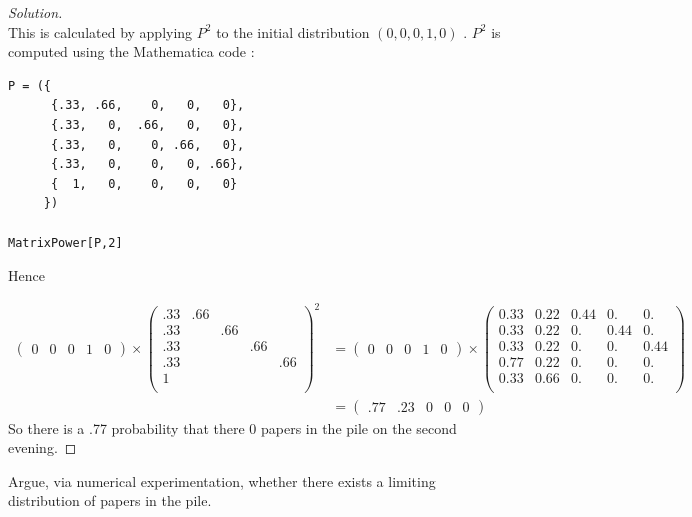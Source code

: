 \documentclass[12pt]{article}
\newenvironment{problem}[2][Problem]{\begin{trivlist}
\item[\hskip \labelsep {\bfseries #1}\hskip \labelsep {\bfseries #2.}]}{\end{trivlist}}
\newenvironment{solution}
  {\begin{proof}[Solution]\renewcommand{\qedsymbol}{}}
  {\end{proof}}
\begin{document}
\begin{solution}\ \\

This is calculated by applying $ P^2 $ to the initial distribution $ (0,0,0,1,0) $ . $P^2$ is computed using the Mathematica code : \\

\begin{lstlisting}[frame=single]  
P = ({
      {.33, .66,    0,   0,   0},
      {.33,   0,  .66,   0,   0},
   	  {.33,   0,    0, .66,   0},
      {.33,   0,    0,   0, .66},
      {  1,   0,    0,   0,   0}
     })
  
MatrixPower[P,2]
\end{lstlisting}Hence 

\begin{align*}
\begin{pmatrix}
0 & 0 &  0   &  1    & 0
\end{pmatrix}\times
\begin{pmatrix} 
	.33 & .66 &     &      &      \\ 
	.33 &     & .66 &      &      \\
	.33 &     &     & .66  &      \\ 
	.33 &     &     &      & .66  \\
	1   &     &     &      &      \\  
\end{pmatrix}^2 & = \begin{pmatrix}
0 & 0 &  0   &  1    & 0
\end{pmatrix}\times
\begin{pmatrix} 
 0.33 & 0.22 & 0.44 & 0. & 0. \\
 0.33 & 0.22 & 0. & 0.44 & 0. \\
 0.33 & 0.22 & 0. & 0. & 0.44 \\
 0.77 & 0.22 & 0. & 0. & 0. \\
 0.33 & 0.66 & 0. & 0. & 0. \\
\end{pmatrix}\\
& = \begin{pmatrix}
.77 & .23 &  0   &  0    & 0
\end{pmatrix}
\end{align*}
So there is a .77 probability that there 0 papers in the pile on the second evening.
\end{solution}


\begin{problem}{2(c)} %
Argue, via numerical experimentation, whether there exists a limiting distribution of
papers in the pile.


\end{problem}
\end{document}
